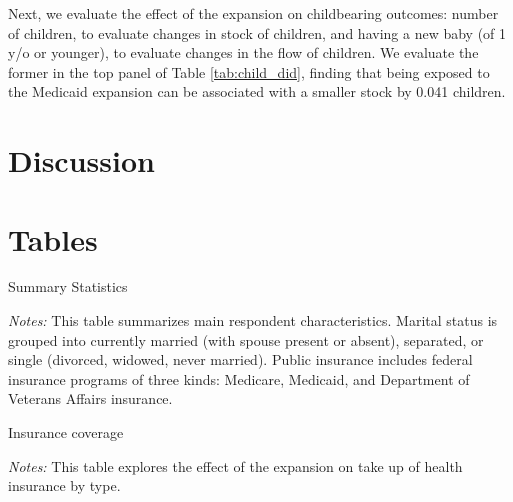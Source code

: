 \documentclass{article}
\begin{document}
Next, we evaluate the effect of the expansion on childbearing outcomes: number of children, to evaluate changes in stock of children, and having a new baby (of 1 y/o or younger), to evaluate changes in the flow of children. We evaluate the former in the top panel of Table \ref{tab:child_did}, finding that being exposed to the Medicaid expansion can be associated with a smaller stock by 0.041 children. %





\section{Discussion}


\newpage


\newpage
\section{Tables}

\begin{table}[h!]
\begin{centering}
\singlespacing
\caption{Summary Statistics}
\label{tab:sumstat}
\end{centering}
\begin{spacing}{1}
\begin{footnotesize}

\textit{Notes:} This table summarizes main respondent characteristics. Marital status is grouped into currently married (with spouse present or absent), separated, or single (divorced, widowed, never married). Public insurance includes federal insurance programs of three kinds: Medicare, Medicaid, and Department of Veterans Affairs insurance.
\end{footnotesize}
\end{spacing}
\end{table}

\newpage
\begin{table}[h!]
\begin{centering}
\singlespacing
\caption{Insurance coverage}
\label{tab:cov}
\end{centering}
\begin{spacing}{1}
\begin{footnotesize}

\textit{Notes:} This table explores the effect of the expansion on take up of health insurance by type.
\end{footnotesize}
\end{spacing}
\end{table}
\end{document}
